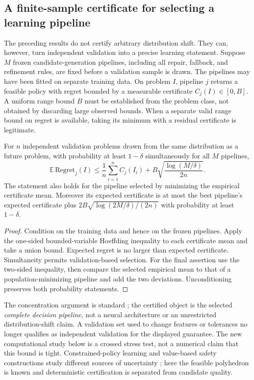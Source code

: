 \subsection{A finite-sample certificate for selecting a learning pipeline}
The preceding results do not certify arbitrary distribution shift. They can, however, turn independent validation into a precise learning statement. Suppose $M$ frozen candidate-generation pipelines, including all repair, fallback, and refinement rules, are fixed before a validation sample is drawn. The pipelines may have been fitted on separate training data. On problem $I$, pipeline $j$ returns a feasible policy with regret bounded by a measurable certificate $C_j(I)\in[0,B]$. A uniform range bound $B$ must be established from the problem class, not obtained by discarding large observed bounds. When a separate valid range bound on regret is available, taking its minimum with a residual certificate is legitimate.

\begin{proposition}\label{prop:r12-risk}
For $n$ independent validation problems drawn from the same distribution as a future problem, with probability at least $1-\delta$ simultaneously for all $M$ pipelines,
\begin{equation}\label{eq:r12-risk}
 \mathbb E\,\mathrm{Regret}_j(I)
 \leq\frac1n\sum_{i=1}^n C_j(I_i)
             +B\sqrt{\frac{\log(M/\delta)}{2n}}.
\end{equation}
The statement also holds for the pipeline selected by minimizing the empirical certificate mean. Moreover its expected certificate is at most the best pipeline's expected certificate plus
$2B\sqrt{\log(2M/\delta)/(2n)}$ with probability at least $1-\delta$.
\end{proposition}
\begin{proof}
Condition on the training data and hence on the frozen pipelines. Apply the one-sided bounded-variable Hoeffding inequality to each certificate mean and take a union bound. Expected regret is no larger than expected certificate. Simultaneity permits validation-based selection. For the final assertion use the two-sided inequality, then compare the selected empirical mean to that of a population-minimizing pipeline and add the two deviations. Unconditioning preserves both probability statements.
\end{proof}
The concentration argument is standard \citep{Hoeffding1963}; the certified object is the selected \emph{complete decision pipeline}, not a neural architecture or an unrestricted distribution-shift claim. A validation set used to change features or tolerances no longer qualifies as independent validation for the displayed guarantee. The new computational study below is a crossed stress test, not a numerical claim that this bound is tight. Constrained-policy learning and value-based safety constructions study different sources of uncertainty \citep{Satija2020,WachiSui2020}; here the feasible polyhedron is known and deterministic certification is separated from candidate quality.

